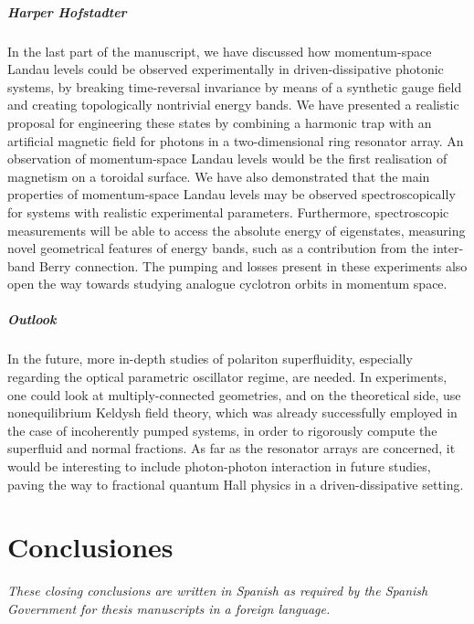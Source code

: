 \paragraph{Harper Hofstadter}
In the last part of the manuscript, we have discussed how
momentum-space Landau levels could be observed experimentally in
driven-dissipative photonic systems, by breaking time-reversal
invariance by means of a synthetic gauge field and creating
topologically nontrivial energy bands. We have presented a realistic
proposal for engineering these states by combining a harmonic trap
with an artificial magnetic field for photons in a two-dimensional
ring resonator array. An observation of momentum-space Landau levels
would be the first realisation of magnetism on a toroidal surface. We
have also demonstrated that the main properties of momentum-space
Landau levels may be observed spectroscopically for systems with
realistic experimental parameters. Furthermore, spectroscopic
measurements will be able to access the absolute energy of
eigenstates, measuring novel geometrical features of energy bands,
such as a contribution from the inter-band Berry connection. The
pumping and losses present in these experiments also open the way
towards studying analogue cyclotron orbits in momentum space.


\paragraph{Outlook}
In the future, more in-depth studies of polariton superfluidity,
especially regarding the optical parametric oscillator regime, are
needed. In experiments, one could look at multiply-connected
geometries, and on the theoretical side, use nonequilibrium Keldysh
field theory, which was already successfully employed in the case of
incoherently pumped systems, in order to rigorously compute the
superfluid and normal fractions. As far as the resonator arrays are
concerned, it would be interesting to include photon-photon
interaction in future studies, paving the way to fractional quantum
Hall physics in a driven-dissipative setting.


\chapter*{Conclusiones}


\textit{These closing conclusions are written in Spanish as required
  by the Spanish Government for thesis manuscripts in a foreign
  language.}

